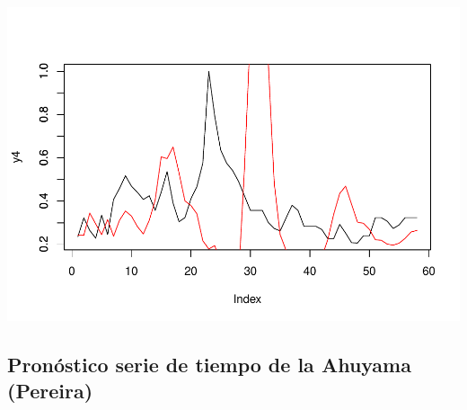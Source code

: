 \documentclass[
]{book}
\begin{document}
\includegraphics{bookdown-demo_files/figure-latex/unnamed-chunk-195-1.pdf}

\hypertarget{pronuxf3stico-serie-de-tiempo-de-la-ahuyama-pereira}{%
\subsection{Pronóstico serie de tiempo de la Ahuyama (Pereira)}\label{pronuxf3stico-serie-de-tiempo-de-la-ahuyama-pereira}}
\end{document}
